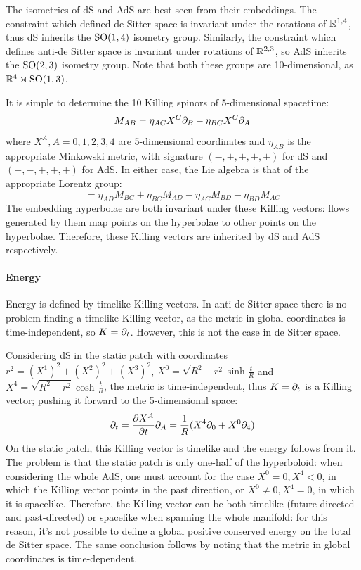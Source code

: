 The isometries of dS and AdS are best seen from their embeddings.
The constraint  which defined de Sitter space is invariant under the rotations of $ \mathbb{R}^{1,4} $, thus dS inherits the $ \mathrm{SO}(1,4) $ isometry group. Similarly, the constraint  which defines anti-de Sitter space is invariant under rotations of $ \mathbb{R}^{2,3} $, so AdS inherits the $ \mathrm{SO}(2,3) $ isometry group. Note that both these groups are 10-dimensional, as $ \mathbb{R}^4 \rtimes \mathrm{SO}(1,3) $.

It is simple to determine the 10 Killing spinors of 5-dimensional spacetime:
\begin{equation*}
  M_{AB} = \eta_{AC} X^C \partial_B - \eta_{BC} X^C \partial_A
\end{equation*}
where $ X^A, A = 0,1,2,3,4 $ are 5-dimensional coordinates and $ \eta_{AB} $ is the appropriate Minkowski metric, with signature $ (-,+,+,+,+) $ for dS and $ (-,-,+,+,+) $ for AdS. In either case, the Lie algebra is that of the appropriate Lorentz group:
\begin{equation*}
  [M_{AB}, M_{CD}] = \eta_{AD} M_{BC} + \eta_{BC} M_{AD} - \eta_{AC} M_{BD} - \eta_{BD} M_{AC}
\end{equation*}
The embedding hyperbolae are both invariant under these Killing vectors: flows generated by them map points on the hyperbolae to other points on the hyperbolae. Therefore, these Killing vectors are inherited by dS and AdS respectively.

\paragraph{Energy}

Energy is defined by timelike Killing vectors. In anti-de Sitter space there is no problem finding a timelike Killing vector, as the metric in global coordinates  is time-independent, so $ K = \partial_t $. However, this is not the case in de Sitter space.

Considering dS in the static patch with coordinates $ r^2 = (X^1)^2 + (X^2)^2 + (X^3)^2 $, $ X^0 = \sqrt{R^2 - r^2} \sinh \frac{t}{R} $ and $ X^4 = \sqrt{R^2 - r^2} \cosh \frac{t}{R} $, the metric  is time-independent, thus $ K = \partial_t $ is a Killing vector; pushing it forward to the 5-dimensional space:
\begin{equation*}
  \partial_t = \frac{\partial X^A}{\partial t} \partial_A = \frac{1}{R} ( X^4 \partial_0 + X^0 \partial_4 )
\end{equation*}
On the static patch, this Killing vector is timelike and the energy  follows from it. The problem is that the static patch is only one-half of the hyperboloid: when considering the whole AdS, one must account for the case $ X^0 = 0, X^4 < 0 $, in which the Killing vector points in the past direction, or $ X^0 \neq 0, X^4 = 0 $, in which it is spacelike. Therefore, the Killing vector can be both timelike (future-directed and past-directed) or spacelike when spanning the whole manifold: for this reason, it's not possible to define a global positive conserved energy on the total de Sitter space. The same conclusion follows by noting that the metric in global coordinates  is time-dependent.

